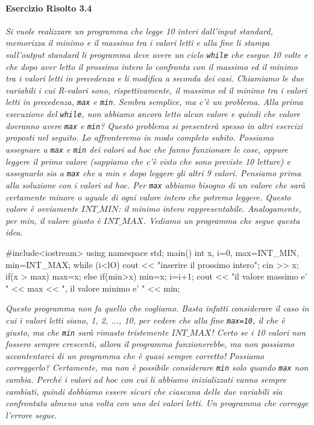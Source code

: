 \paragraph{Esercizio Risolto 3.4}
\textit{Si vuole realizzare un programma che legge 10 interi dal­l'input standard, memorizza il minimo e il massimo tra i valori letti e alla fine li stampa sull'output standard li programma deve avere un ciclo \texttt{while} che esegue 10 volte e che dopo aver letto il prossimo intero lo confronta con il massimo ed il minimo tra i valori letti in precedenza e li modifica a seconda dei casi.
Chiamiamo le due variabili i cui R-valori sono, rispettivamente, il massimo ed il minimo tra i valori letti in precedenza, \texttt{max} e \texttt{min}.
Sembra semplice, ma c'è un problema.
Alla prima esecuzione del \texttt{while}, non abbiamo ancora letto alcun valore e quindi che valore dovranno avere \texttt{max} e \texttt{min}?
Questo problema si presenterà spesso in altri esercizi proposti nel seguito.
Lo affronteremo in modo completo subito.
Possiamo assegnare a \texttt{max} e \texttt{min} dei valori ad hoc che fanno funzionare le cose, oppure leggere il primo valore (sappiamo che c'è visto che sono previste 10 letture) e assegnarlo sia a \texttt{max} che a min e dopo leggere gli altri 9 valori. Pensiamo prima alla soluzione con i valori ad hoc.
Per \texttt{max} abbiamo bisogno di un valore che sarà certamente minore o uguale di ogni valore intero che potremo leggere.
Questo valore è ovviamente \texttt{$INT\_MIN$}: il minimo intero rappresentabile. Analogamente, per min, il valore giusto è \texttt{$INT\_MAX$}.
Vediamo un programma che segue questa idea.}

\begin{codice}

#include<iostream>
using namespace std;
main() {
  int x, i=0, max=INT_MIN, min=INT_MAX;
  while (i<lO) {
    cout << "inserire il prossimo intero";
    cin >> x;
    if(x > max)
      max=x;
    else
      if(min>x)
        min=x;
    i=i+1;
  }
  cout << "il valore massimo e' " << max << ", il valore minimo e' " << min;
}
\end{codice}

\noindent \textit{Questo programma non fa quello che vogliamo.
Basta infatti considerare il caso in cui i valori letti siano, 1, 2, ..., 10, per vedere che alla fine \texttt{max=10}, il che è giusto, ma che \texttt{min} sarà rimasto tristemente \texttt{$INT\_MAX$}!
Certo se i 10 valori non fossero sempre crescenti, allora il programma funzionerebbe, ma non possiamo accontentarci di un programma che è quasi sempre corretto!
Possiamo correggerlo?
Certamente, ma non è possibile considerare \texttt{min} solo quando \texttt{max} non cambia.
Perché i valori ad hoc con cui li abbiamo inizializzati vanno sempre cambiati, quindi dobbiamo essere sicuri che ciascuna delle due variabili sia confrontata almeno una volta con uno dei valori letti.
Un programma che corregge l'errore segue.}

